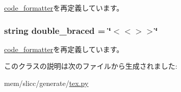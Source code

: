 \hyperlink{classm5_1_1util_1_1code__formatter_1_1code__formatter_a935da82b8051a1db1c662d8e4bd75e58}{code\_\-formatter}を再定義しています。\hypertarget{classslicc_1_1generate_1_1tex_1_1tex__formatter_af6860356c79d14b959158766081ef166}{
\subsubsection[{double\_\-braced}]{\setlength{\rightskip}{0pt plus 5cm}string {\bf double\_\-braced} = \char`\"{}$<$$<$$>$$>$\char`\"{}}}
\label{classslicc_1_1generate_1_1tex_1_1tex__formatter_af6860356c79d14b959158766081ef166}


\hyperlink{classm5_1_1util_1_1code__formatter_1_1code__formatter_af6860356c79d14b959158766081ef166}{code\_\-formatter}を再定義しています。

このクラスの説明は次のファイルから生成されました:\begin{DoxyCompactItemize}
\item 
mem/slicc/generate/\hyperlink{tex_8py}{tex.py}\end{DoxyCompactItemize}
